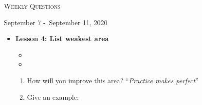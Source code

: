 \centerline{\LARGE\textsc{Weekly Questions}}
\centerline{September 7 -\ September 11, 2020}
\textbf{}
\begin{itemize}
  \item[] \textbf{\large Lesson 4: List weakest area}
  \begin{itemize}
    \item 
    \item 
  \end{itemize} 
  \begin{enumerate}
    \item How will you improve this area? ``\emph{Practice makes perfect}''
    \item Give an example: 
  \end{enumerate}
\end{itemize}